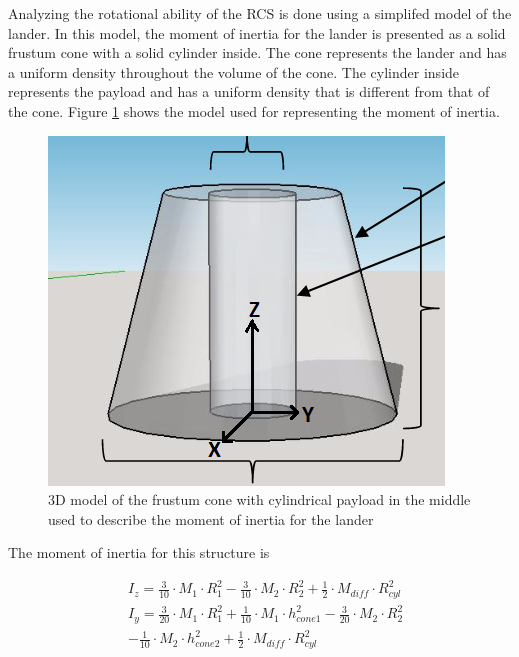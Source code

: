 Analyzing the rotational ability of the RCS is done using a simplifed model of the lander. In this model, the moment of inertia for the lander is presented as a solid frustum cone with a solid cylinder inside. The cone represents the lander and has a uniform density throughout the volume of the cone. The cylinder inside represents the payload and has a uniform density that is different from that of the cone. Figure \ref{fig:cone} shows the model used for representing the moment of inertia.

\begin{figure}[htb]
\begin{center}
\includegraphics[scale=1]{figures/RCS/cone_payload}
\caption{3D model of the frustum cone with cylindrical payload in the middle used to describe the moment of inertia for the lander}
\label{fig:cone}
\end{center}
\end{figure}


The moment of inertia for this structure is

\begin{equation}
\begin{split}
   & I_{z} = \frac{3}{10} \cdot M_{1} \cdot R_{1}^2 - \frac{3}{10} \cdot M_{2} \cdot R_{2}^2 + \frac{1}{2} \cdot M_{diff} \cdot R_{cyl}^2\\
   & I_{y} = \frac{3}{20} \cdot M_{1} \cdot R_{1}^2 + \frac{1}{10} \cdot M_{1} \cdot h_{cone1}^2 - \frac{3}{20} \cdot M_{2} \cdot R_{2}^2\\
   &     - \frac{1}{10} \cdot M_{2} \cdot h_{cone2}^2 + \frac{1}{2} \cdot M_{diff} \cdot R_{cyl}^2
\end{split}
\end{equation}

